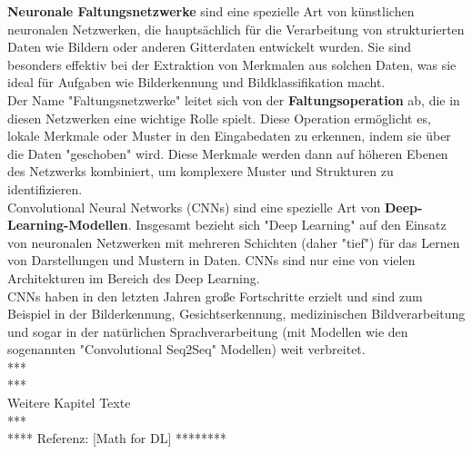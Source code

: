 \documentclass[12pt]{article}
\begin{document}
\textbf{Neuronale Faltungsnetzwerke} sind eine spezielle Art von künstlichen neuronalen Netzwerken, die hauptsächlich für die Verarbeitung von strukturierten Daten wie Bildern oder anderen Gitterdaten entwickelt wurden. Sie sind besonders effektiv bei der Extraktion von Merkmalen aus solchen Daten, was sie ideal für Aufgaben wie Bilderkennung und Bildklassifikation macht.
\\
Der Name "Faltungsnetzwerke" leitet sich von der \textbf{Faltungsoperation} ab, die in diesen Netzwerken eine wichtige Rolle spielt. Diese Operation ermöglicht es, lokale Merkmale oder Muster in den Eingabedaten zu erkennen, indem sie über die Daten "geschoben" wird. Diese Merkmale werden dann auf höheren Ebenen des Netzwerks kombiniert, um komplexere Muster und Strukturen zu identifizieren.
\\Convolutional Neural Networks (CNNs) sind eine spezielle Art von \textbf {Deep-Learning-Modellen}. Insgesamt bezieht sich "Deep Learning" auf den Einsatz von neuronalen Netzwerken mit mehreren Schichten (daher "tief") für das Lernen von Darstellungen und Mustern in Daten. CNNs sind nur eine von vielen Architekturen im Bereich des Deep Learning.\\
CNNs haben in den letzten Jahren große Fortschritte erzielt und sind zum Beispiel in der Bilderkennung, Gesichtserkennung, medizinischen Bildverarbeitung und sogar in der natürlichen Sprachverarbeitung (mit Modellen wie den sogenannten "Convolutional Seq2Seq" Modellen) weit verbreitet.\\
***\\
***\\ Weitere Kapitel Texte \\
***\\
**** Referenz: [Math for DL] ******** 
\end{document}
